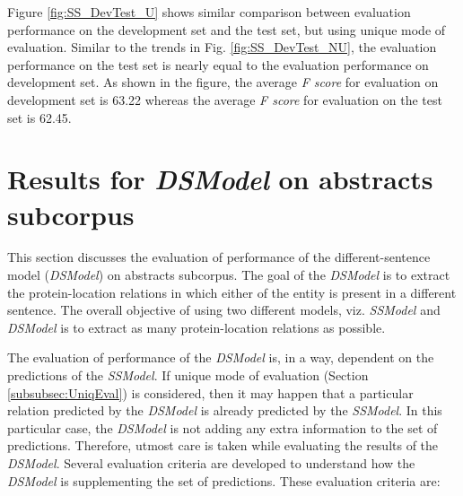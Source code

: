 Figure \ref{fig:SS_DevTest_U} shows similar comparison between evaluation performance on the development set and the test set, but using unique mode of evaluation. Similar to the trends in Fig. \ref{fig:SS_DevTest_NU}, the evaluation performance on the test set is nearly equal to the evaluation performance on development set. As shown in the figure, the average \textit{F score} for evaluation on development set is 63.22 whereas the average \textit{F score} for evaluation on the test set is 62.45.

\section{Results for \textit{DSModel} on abstracts subcorpus}

This section discusses the evaluation of performance of the different-sentence model (\textit{DSModel}) on abstracts subcorpus. The goal of the \textit{DSModel} is to extract the protein-location relations in which either of the entity is present in a different sentence. The overall objective of using two different models, viz. \textit{SSModel} and \textit{DSModel} is to extract as many protein-location relations as possible.

The evaluation of performance of the \textit{DSModel} is, in a way, dependent on the predictions of the \textit{SSModel}. If unique mode of evaluation (Section \ref{subsubsec:UniqEval}) is considered, then it may happen that a particular relation predicted by the \textit{DSModel} is already predicted by the \textit{SSModel}. In this particular case, the \textit{DSModel} is not adding any extra information to the set of predictions. Therefore, utmost care is taken while evaluating the results of the \textit{DSModel}. Several evaluation criteria are developed to understand how the \textit{DSModel} is supplementing the set of predictions. These evaluation criteria are:

